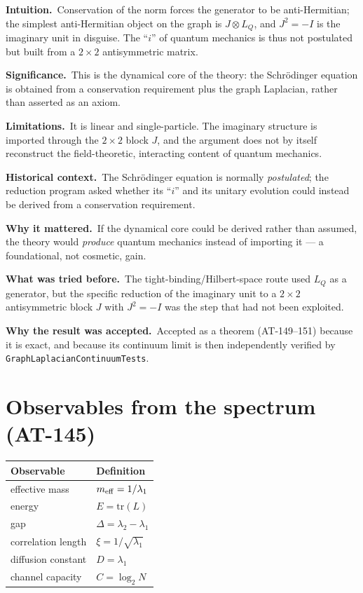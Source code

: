 \documentclass[10pt,twoside,openany]{book}
\newcommand{\theoremnotes}[3]{%
  \par\medskip\noindent
  \textbf{Intuition.}\ #1\par
  \textbf{Significance.}\ #2\par
  \textbf{Limitations.}\ #3\par}
\newcommand{\historynotes}[4]{%
  \par\smallskip\noindent
  \textbf{Historical context.}\ #1\par
  \textbf{Why it mattered.}\ #2\par
  \textbf{What was tried before.}\ #3\par
  \textbf{Why the result was accepted.}\ #4\par}
\begin{document}
\theoremnotes
{Conservation of the norm forces the generator to be anti-Hermitian; the simplest
anti-Hermitian object on the graph is $J\otimes L_Q$, and $J^2=-I$ is the imaginary unit
in disguise. The ``$i$'' of quantum mechanics is thus not postulated but built from a
$2\times2$ antisymmetric matrix.}
{This is the dynamical core of the theory: the Schr\"odinger equation is obtained from a
conservation requirement plus the graph Laplacian, rather than asserted as an axiom.}
{It is linear and single-particle. The imaginary structure is imported through the
$2\times2$ block $J$, and the argument does not by itself reconstruct the
field-theoretic, interacting content of quantum mechanics.}

\historynotes
{The Schr\"odinger equation is normally \emph{postulated}; the reduction program asked
whether its ``$i$'' and its unitary evolution could instead be derived from a conservation
requirement.}
{If the dynamical core could be derived rather than assumed, the theory would \emph{produce}
quantum mechanics instead of importing it --- a foundational, not cosmetic, gain.}
{The tight-binding/Hilbert-space route used $L_Q$ as a generator, but the specific reduction
of the imaginary unit to a $2\times2$ antisymmetric block $J$ with $J^2=-I$ was the step
that had not been exploited.}
{Accepted as a theorem (AT-149--151) because it is exact, and because its continuum limit
is then independently verified by \texttt{GraphLaplacianContinuumTests}.}

\section{Observables from the spectrum (AT-145)}

\begin{center}
\begin{tabular}{ll}
\toprule
Observable & Definition \\
\midrule
effective mass & $m_{\rm eff} = 1/\lambda_1$ \\
energy & $E = \mathrm{tr}(L)$ \\
gap & $\Delta = \lambda_2-\lambda_1$ \\
correlation length & $\xi = 1/\sqrt{\lambda_1}$ \\
diffusion constant & $D = \lambda_1$ \\
channel capacity & $C = \log_2 N$ \\
\bottomrule
\end{tabular}
\end{center}
\end{document}
